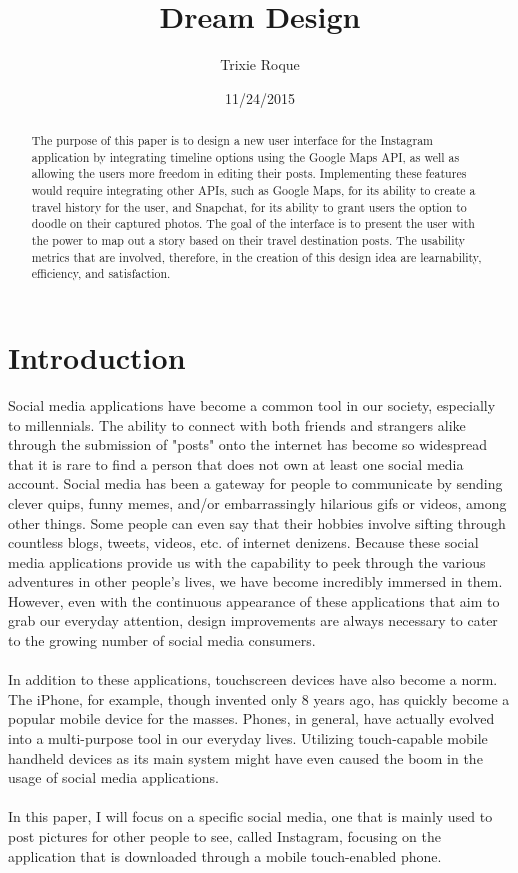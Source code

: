 \documentclass[11pt]{article}
\title{Dream Design}
\author{Trixie Roque}
\date{11/24/2015}
\begin{document}
\maketitle

\begin{abstract}
The purpose of this paper is to design a new user interface for the Instagram application by integrating timeline options using the Google Maps API, as well as allowing the users more freedom in editing their posts. Implementing these features would require integrating other APIs, such as Google Maps, for its ability to create a travel history for the user, and Snapchat, for its ability to grant users the option to doodle on their captured photos. The goal of the interface is to present the user with the power to map out a story based on their travel destination posts. The usability metrics that are involved, therefore, in the creation of this design idea are learnability, efficiency, and satisfaction.
\end{abstract}

\pagebreak
\tableofcontents

\pagebreak

\section{Introduction}
\label{Introduction}
   \indent 
    \indent Social media applications have become a common tool in our society, especially to millennials. The ability to connect with both friends and strangers alike through the submission of "posts" onto the internet has become so widespread that it is rare to find a person that does not own at least one social media account. Social media has been a gateway for people to communicate by sending clever quips, funny memes, and/or embarrassingly hilarious gifs or videos, among other things. Some people can even say that their hobbies involve sifting through countless blogs, tweets, videos, etc. of internet denizens. Because these social media applications provide us with the capability to peek through the various adventures in other people's lives, we have become incredibly immersed in them. However, even with the continuous appearance of these applications that aim to grab our everyday attention, design improvements are always necessary to cater to the growing number of social media consumers. \\ \\
     \indent In addition to these applications, touchscreen devices have also become a norm. The iPhone, for example, though invented only 8 years ago, has quickly become a popular mobile device for the masses. Phones, in general, have actually evolved into a multi-purpose tool in our everyday lives. Utilizing touch-capable mobile handheld devices as its main system might have even caused the boom in the usage of social media applications. \\ \\
     \indent In this paper, I will focus on a specific social media, one that is mainly used to post pictures for other people to see, called Instagram, focusing on the application that is downloaded through a mobile touch-enabled phone.
     
\end{document}

